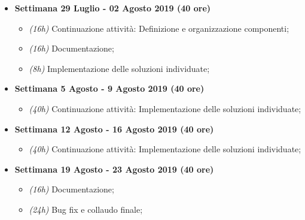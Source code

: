{\begin{itemize}
\begin{itemize}
            \item \textit{(16h)} Definizione e organizzazione componenti;
        \end{itemize}
        \item \textbf{Settimana \textbf{29 Luglio - 02 Agosto 2019} (40 ore)} 
        \begin{itemize}
            \item \textit{(16h)} Continuazione attività: Definizione e organizzazione componenti;
            \item \textit{(16h)} Documentazione;
            \item \textit{(8h)} Implementazione delle soluzioni individuate;
        \end{itemize}
        \item \textbf{Settimana \textbf{5 Agosto - 9 Agosto 2019} (40 ore)} 
        \begin{itemize}
            \item \textit{(40h)} Continuazione attività: Implementazione delle soluzioni individuate;
        \end{itemize}
        \item \textbf{Settimana \textbf{12 Agosto - 16 Agosto 2019} (40 ore)} 
        \begin{itemize}
            \item \textit{(40h)} Continuazione attività: Implementazione delle soluzioni individuate;
        \end{itemize}
        \item \textbf{Settimana \textbf{19 Agosto - 23 Agosto 2019} (40 ore)} 
        \begin{itemize}
            \item \textit{(16h)} Documentazione;
            \item \textit{(24h)} Bug fix e collaudo finale;
        \end{itemize}
    \end{itemize}
}

\newcommand{\totaleOre}{320}

\newcommand{\obiettiviObbligatori}{
	 \item \underline{\textit{O01}}: Realizzazione del componente "Hydrogen Custom Logon" per \textit{MacOs Mojave};
	 \item \underline{\textit{O02}}: Realizzazione di un installer del componente per \textit{MacOs Mojave};
	 \item \underline{\textit{O03}}: Documentazione di progetto;
	 
}


